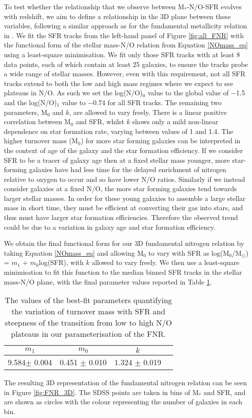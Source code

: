 \documentclass[usenatbib]{mnras} %
\begin{document}
To test whether the relationship that we observe between M$_*$-N/O-SFR evolves with redshift, we aim to define a relationship in the 3D plane between these variables, following a similar approach as for the fundamental metallicity relation in \cite{Curti_2020FMR}. We fit the SFR tracks from the left-hand panel of Figure \ref{fig:all_FNR} with the functional form of the stellar mass-N/O relation from Equation \ref{NOmass_eq} using a least-square minimisation. We fit only those SFR tracks with at least 8 data points, each of which contain at least 25 galaxies, to ensure the tracks probe a wide range of stellar masses. However, even with this requirement, not all SFR tracks extend to both the low and high mass regimes where we expect to see plateaus in N/O. As such we set the log(N/O)$_0$ value to the global value of $-$1.5 and the log(N/O)$_1$ value to $-$0.74 for all SFR tracks. The remaining two parameters, M$_0$ and $k$, are allowed to vary freely. There is a linear positive correlation between M$_0$ and SFR, whilst $k$ shows only a mild non-linear dependence on star formation rate, varying between values of 1 and 1.4. The higher turnover mass (M$_0$) for more star forming galaxies can be interpreted in the context of age of the galaxy and the star formation efficiency. If we consider SFR to be a tracer of galaxy age then at a fixed stellar mass younger, more star-forming galaxies have had less time for the delayed enrichment of nitrogen relative to oxygen to occur and so have lower N/O ratios. Similarly if we instead consider galaxies at a fixed N/O, the more star forming galaxies tend towards larger stellar masses. In order for these young galaxies to assemble a large stellar mass in short time, they must be efficient at converting their gas into stars, and thus must have larger star formation efficiencies. Therefore the observed trend could be due to a variation in galaxy age and star formation efficiency. 


We obtain the final functional form for our 3D fundamental nitrogen relation by taking Equation \ref{NOmass_eq} and allowing M$_0$ to vary with SFR as log(M$_0$/M$_\odot$) = $m_1$ + $m_0$log(SFR), with $k$ allowed to vary freely. We then use a least-square minimisation to fit this function to the median binned SFR tracks in the stellar mass-N/O plane, with the final parameter values reported in Table \ref{tab:FNR_params}.
\begin{table}
 \centering
 \caption{The values of the best-fit parameters quantifying the variation of turnover mass with SFR and steepness of the transition from low to high N/O plateaus in our parameterisation of the FNR.}
 \label{tab:FNR_params}
 \begin{tabular}{cccc}
  \hline
  \hline
  $m_1$ & $m_0$ & $k$\\
  \hline
   9.584$\pm$ 0.004 & 0.451 $\pm$ 0.010 & 1.324 $\pm$ 0.019 \\[2pt]
  \hline
  \hline
 \end{tabular}
\end{table}
The resulting 3D representation of the fundamental nitrogen relation can be seen in Figure \ref{fig:FNR_3D}. The SDSS points are taken in bins of M$_*$ and SFR, and are shown as circles with the colour representing the number of galaxies in each bin.
\end{document}

